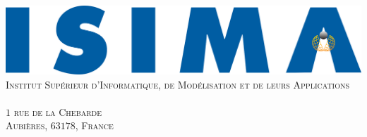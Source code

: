 

\begin{titlepage}

       \begin{minipage}{0.4\textwidth}
        \begin{flushleft}
            \vspace{-25mm}
            \includegraphics[scale = 0.32]{Pictures/ISIMA.png}
            \textsc{\vspace{1.2em} \small \\ Institut Supérieur d'Informatique,
            	de Modélisation et de leurs Applications \\}
            \textsc{\small \\ $1$ rue de la Chebarde \\}
            \textsc{\small Aubières, $63178$, France \\}
            
        \end{flushleft}
    \end{minipage}
    ~
    \begin{minipage}{0.5\textwidth}
        \vspace{1cm} %
        \begin{flushright}


\end{flushright}
\end{minipage}
\end{titlepage}
